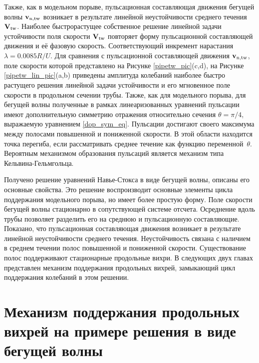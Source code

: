 Также, как в модельном порыве, пульсационная составляющая движения бегущей волны $\mathbf{v}_\mathrm{n,tw}$ возникает в результате линейной неустойчивости среднего течения $\mathbf{V}_\mathrm{tw}$. Наиболее быстрорастущее собственное решение линейной задачи устойчивости поля скорости $\mathbf{V}_\mathrm{tw}$ повторяет форму пульсационной составляющей движения и её фазовую скорость. Соответствующий инкремент нарастания $\lambda = 0.0085R/U$. Для сравнения с пульсационной составляющей движения $\mathbf{v}_\mathrm{n,tw}$, поле скорости которой представлено на Рисунке \ref{pipetw_pic}(c,d), на Рисунке \ref{pipetw_lin_pic}(a,b) приведены амплитуда колебаний наиболее быстро растущего решения линейной задачи устойчивости и его мгновенное поле скорости в продольном сечении трубы. Также, как для модельного порыва, для бегущей волны полученные в рамках линеаризованных уравнений пульсации имеют дополнительную симметрию отражения относительно сечения $\theta = \pi/4$, выражаемую уравнением \eqref{dop_sym_eq}. Пульсации достигают своего максимума между полосами повышенной и пониженной скорости. В этой области находится точка перегиба, если рассматривать среднее течение как функцию переменной~$\theta$. Вероятным механизмом образования пульсаций является механизм типа Кельвина-Гельмгольца.


Получено решение уравнений Навье-Стокса в виде бегущей волны, описаны его основные свойства. Это решение воспроизводит основные элементы цикла поддержания модельного порыва, но имеет более простую форму. Поле скорости бегущей волны стационарно в сопутствующей системе отсчета. Осреднение вдоль трубы позволяет разделить его на среднюю и пульсационную составляющие. Показано, что пульсационная составляющая движения возникает в результате линейной неустойчивости среднего течения. Неустойчивость связана с наличием в среднем течении полос повышенной и пониженной скорости. Существование полос поддерживают стационарные продольные вихри. В следующих двух главах представлен механизм поддержания продольных вихрей, замыкающий цикл поддержания колебаний в этом решении. 


\section{Механизм поддержания продольных вихрей на примере решения в виде бегущей волны}


